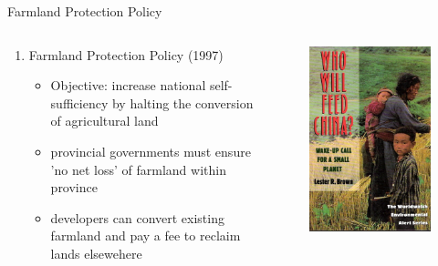 \documentclass[newPxFont]{beamer}
\begin{document}
\begin{frame}[c]{Farmland Protection Policy }
	\begin{columns}
		\begin{column}{.68\linewidth}
			\begin{enumerate}   
				\item{Farmland Protection Policy (1997)}
				\begin{itemize}  
					\item{Objective: increase national self-sufficiency by halting the conversion of agricultural land}
					\item{provincial governments must ensure 'no net loss' of farmland within province}
					\item{developers can convert existing farmland and pay a fee to reclaim lands elsewehere}
				\end{itemize}  
			\end{enumerate}
		\end{column}
		\begin{column}{.3\linewidth}
			\begin{figure}
				\centering
				\includegraphics[width=0.9\linewidth]{Brown.png}
			\end{figure}
		\end{column}
	\end{columns}
\end{frame}
\end{document}
